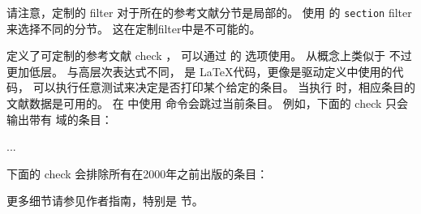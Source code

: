 \begin{ltxexample}[style=ifthen,morekeywords={\\type,\\keyword}]{}
\end{ltxexample}
%
请注意，定制的 filter 对于所在的参考文献分节是局部的。
使用  的 \texttt{section} filter 来选择不同的分节。
这在定制filter中是不可能的。

\begin{ltxsyntax}



定义了可定制的参考文献 check ，
可以通过  的  选项使用。
 从概念上类似于  不过更加低层。
与高层次表达式不同， 是 \LaTeX 代码，更像是驱动定义中使用的代码，
可以执行任意测试来决定是否打印某个给定的条目。
当执行  时，相应条目的文献数据是可用的。
在  中使用  命令会跳过当前条目。
例如，下面的 check 只会输出带有  域的条目：

\begin{ltxexample}
...
\printbibliography[<<check=abstract>>]
\end{ltxexample}
%
下面的 check 会排除所有在2000年之前出版的条目：

\begin{ltxexample}
\end{ltxexample}
%
更多细节请参见作者指南，特别是  节。

\end{ltxsyntax}

